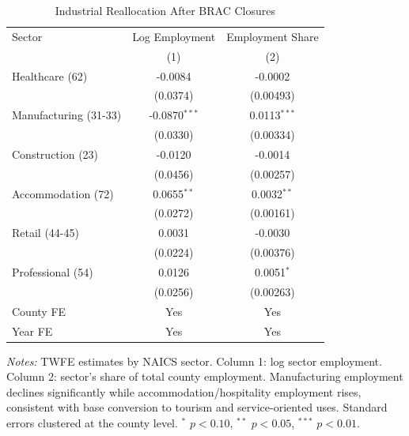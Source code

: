 \begin{table}[!t]
\centering
\caption{Industrial Reallocation After BRAC Closures}
\label{tab:realloc}
\begin{tabular}{lcc}
\hline\hline
Sector & Log Employment & Employment Share \\
 & (1) & (2) \\
\hline
Healthcare (62) & -0.0084 & -0.0002 \\
 & (0.0374) & (0.00493) \\
[3pt]
Manufacturing (31-33) & -0.0870$^{***}$ & 0.0113$^{***}$ \\
 & (0.0330) & (0.00334) \\
[3pt]
Construction (23) & -0.0120 & -0.0014 \\
 & (0.0456) & (0.00257) \\
[3pt]
Accommodation (72) & 0.0655$^{**}$ & 0.0032$^{**}$ \\
 & (0.0272) & (0.00161) \\
[3pt]
Retail (44-45) & 0.0031 & -0.0030 \\
 & (0.0224) & (0.00376) \\
[3pt]
Professional (54) & 0.0126 & 0.0051$^{*}$ \\
 & (0.0256) & (0.00263) \\
[3pt]
\hline
County FE & Yes & Yes \\
Year FE & Yes & Yes \\
\hline\hline
\end{tabular}
\begin{tablenotes}[flushleft]\small
\item \textit{Notes:} TWFE estimates by NAICS sector. Column 1: log sector employment. Column 2: sector's share of total county employment. Manufacturing employment declines significantly while accommodation/hospitality employment rises, consistent with base conversion to tourism and service-oriented uses. Standard errors clustered at the county level. $^{*}$ $p<0.10$, $^{**}$ $p<0.05$, $^{***}$ $p<0.01$.
\end{tablenotes}
\end{table}

